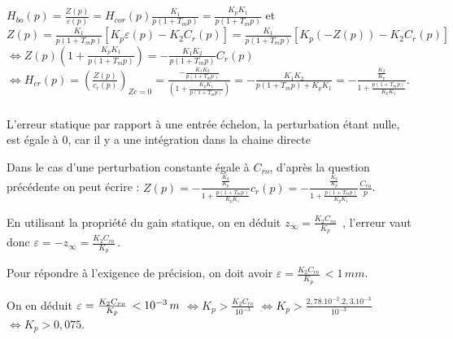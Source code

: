 \documentclass[10pt,fleqn]{article} %
\begin{document}
\newpage
\begin{multicols}{2}
\setcounter{exo}{0}

\subparagraph{}\textit{}%


${H_{bo}}(p) = \frac{{Z(p)}}{{\varepsilon (p)}} = {H_{cor}}(p)\frac{{{K_1}}}{{p(1 + {T_m}p)}} = \frac{{{K_p}{K_1}}}{{p(1 + {T_m}p)}}$
et $Z(p) = \frac{{{K_1}}}{{p(1 + {T_m}p)}}\left[ {{K_p}\varepsilon (p) - {K_2}{C_r}(p)} \right] = \frac{{{K_1}}}{{p(1 + {T_m}p)}}\left[ {{K_p}( - Z(p)) - {K_2}{C_r}(p)} \right]$
$\Leftrightarrow 
Z(p)(1 + \frac{{{K_p}{K_1}}}{{p(1 + {T_m}p)}}) =  - \frac{{{K_1}{K_2}}}{{p(1 + {T_m}p)}}{C_r}(p)$
$\Leftrightarrow 
{H_{cr}}(p) = {\left( {\frac{{Z(p)}}{{{c_r}(p)}}} \right)_{Zc = 0}} = \frac{{ - \frac{{{K_1}{K_2}}}{{p(1 + {T_m}p)}}}}{{(1 + \frac{{{K_p}{K_1}}}{{p(1 + {T_m}p)}})}} =  - \frac{{{K_1}{K_2}}}{{p(1 + {T_m}p) + {K_p}{K_1}}} =  - \frac{{\frac{{{K_2}}}{{{K_p}}}}}{{1 + \frac{{p(1 + {T_m}p)}}{{{K_p}{K_1}}}}}$.

\subparagraph{}\textit{}%

L'erreur statique par rapport  à une entrée échelon, la perturbation étant nulle, est égale à 0, car il y a une intégration dans la chaine directe

Dans le cas d'une perturbation constante égale à $C_{ro}$, d'après la question précédente on peut écrire :  
$
Z(p) =  - \frac{{\frac{{{K_2}}}{{{K_p}}}}}{{1 + \frac{{p(1 + {T_m}p)}}{{{K_p}{K_1}}}}}{c_r}(p) = - \frac{{\frac{{{K_2}}}{{{K_p}}}}}{{1 + \frac{{p(1 + {T_m}p)}}{{{K_p}{K_1}}}}}\frac{{{C_{ro}}}}{p}$.

En utilisant la propriété du gain statique, on en déduit ${z_\infty } =  \frac{{{K_2}{C_{ro}}}}{{{K_p}}}\,$ , l'erreur vaut donc  $\varepsilon  =  -{z_\infty }= \frac{{{K_2}{C_{ro}}}}{{{K_p}}}\,$.

Pour répondre à l'exigence de précision, on doit avoir $\varepsilon  = \frac{{{K_2}{C_{ro}}}}{{{K_p}}}\, < 1\,mm$.

On en déduit $
\varepsilon  =  \frac{{{K_2}{C_{ro}}}}{{{K_p}}}\, < {10^{ - 3}}\,m\\$
$\Leftrightarrow {K_p} > \frac{{{K_2}{C_{ro}}}}{{{{10}^{ - 3}}}}$
$\Leftrightarrow {K_p} > \frac{{{{2,78.10}^{ - 2}}{{.2,3.10}^{ - 3}}}}{{{{10}^{ - 3}}}}$
$\Leftrightarrow 
{K_p} > 0,075$.





\end{multicols}
\end{document}
